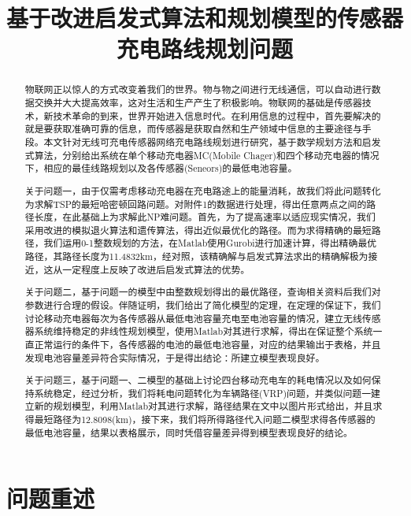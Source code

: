 \documentclass[withoutpreface,bwprint]{cumcmthesis} %
\title{基于改进启发式算法和规划模型的传感器充电路线规划问题}
\begin{document}
\maketitle
\begin{abstract}
物联网正以惊人的方式改变着我们的世界。物与物之间进行无线通信，可以自动进行数据交换并大大提高效率，这对生活和生产产生了积极影响。物联网的基础是传感器技术，新技术革命的到来，世界开始进入信息时代。在利用信息的过程中，首先要解决的就是要获取准确可靠的信息，而传感器是获取自然和生产领域中信息的主要途径与手段。本文针对无线可充电传感器网络充电路线规划进行研究，基于数学规划方法和启发式算法，分别给出系统在单个移动充电器MC(Mobile Chager)和四个移动充电器的情况下，相应的最佳线路规划以及各传感器(Seneors)的最低电池容量。\par
关于问题一，由于仅需考虑移动充电器在充电路途上的能量消耗，故我们将此问题转化为求解TSP的最短哈密顿回路问题。对附件1的数据进行处理，得出任意两点之间的路径长度，在此基础上为求解此NP难问题。首先，为了提高速率以适应现实情况，我们采用改进的模拟退火算法和遗传算法，得出近似最优化的路径。而为求得精确的最短路径，我们运用0-1整数规划的方法，在Matlab使用Gurobi进行加速计算，得出精确最优路径，其路径长度为11.4832km，经对照，该精确解与启发式算法求出的精确解极为接近，这从一定程度上反映了改进后启发式算法的优势。\par
关于问题二，基于问题一的模型中由整数规划得出的最优路径，查询相关资料后我们对参数进行合理的假设。伴随证明，我们给出了简化模型的定理，在定理的保证下，我们讨论移动充电器每次为各传感器从最低电池容量充电至电池容量的情况，建立无线传感器系统维持稳定的非线性规划模型，使用Matlab对其进行求解，得出在保证整个系统一直正常运行的条件下，各传感器的电池的最低电池容量，对应的结果输出于表格，并且发现电池容量差异符合实际情况，于是得出结论：所建立模型表现良好。\par
关于问题三，基于问题一、二模型的基础上讨论四台移动充电车的耗电情况以及如何保持系统稳定，经过分析，我们将耗电问题转化为车辆路径(VRP)问题，并类似问题一建立新的规划模型，利用Matlab对其进行求解，路径结果在文中以图片形式给出，并且求得最短路径为12.8098(km)，接下来，我们将所得路径代入问题二模型求得各传感器的最低电池容量，结果以表格展示，同时凭借容量差异得到模型表现良好的结论。


\end{abstract}



\section{问题重述}
\end{document}
